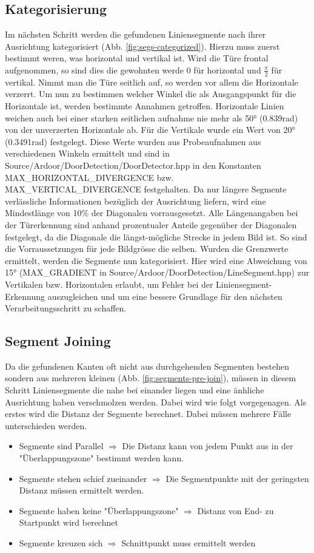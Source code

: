 \subsection{Kategorisierung}
Im nächsten Schritt werden die gefundenen Liniensegmente nach ihrer Ausrichtung kategorisiert (Abb. \ref{fig:segs-categorized}). Hierzu muss zuerst bestimmt weren, was horizontal und vertikal ist. Wird die Türe frontal aufgenommen, so sind dies die gewohnten werde $0$ für horizontal und $\frac{\pi}{2}$ für vertikal. Nimmt man die Türe seitlich auf, so werden vor allem die Horizontale verzerrt. Um nun zu bestimmen welcher Winkel die als Ausgangspunkt für die Horizontale ist, werden bestimmte Annahmen getroffen. Horizontale Linien weichen auch bei einer starken seitlichen aufnahme nie mehr als 50° (0.839rad) von der unverzerten Horizontale ab. Für die Vertikale wurde ein Wert von 20° (0.3491rad) festgelegt. Diese Werte wurden aus Probeaufnahmen aus verschiedenen Winkeln ermittelt und sind in Source/Ardoor/DoorDetection/DoorDetector.hpp in den Konstanten MAX\_HORIZONTAL\_DIVERGENCE bzw. MAX\_VERTICAL\_DIVERGENCE festgehalten. Da nur längere Segmente verlässliche Informationen bezüglich der Ausrichtung liefern, wird eine Mindestlänge von 10\% der Diagonalen vorrausgesetzt. Alle Längenangaben bei der Türerkennung sind anhand prozentualer Anteile gegenüber der Diagonalen festgelegt, da die Diagonale die längst-mögliche Strecke in jedem Bild ist. So sind die Vorraussetzungen für jede Bildgrösse die selben. Wurden die Grenzwerte ermittelt, werden die Segmente nun kategorisiert. Hier wird eine Abweichung von 15° (MAX\_GRADIENT in Source/Ardoor/DoorDetection/LineSegment.hpp) zur Vertikalen bzw. Horizontalen erlaubt, um Fehler bei der Liniensegment-Erkennung auszugleichen und um eine bessere Grundlage für den nächsten Verarbeitungsschritt zu schaffen.

\subsection{Segment Joining}
Da die gefundenen Kanten oft nicht aus durchgehenden Segmenten bestehen sondern aus mehreren kleinen (Abb. \ref{fig:segments-pre-join}), müssen in diesem Schritt Liniensegmente die nahe bei einander liegen und eine änhliche Ausrichtung haben verschmolzen werden. Dabei wird wie folgt vorgegenagen. Als erstes wird die Distanz der Segmente berechnet. Dabei müssen mehrere Fälle unterschieden werden.

\begin{itemize}
	\item Segmente sind Parallel $\Rightarrow$ Die Distanz kann von jedem Punkt aus in der "Überlappungszone" bestimmt werden kann.
	\item Segmente stehen schief zueinander $\Rightarrow$ Die Segmentpunkte mit der geringsten Distanz müssen ermittelt werden.
	\item Segmente haben keine "Überlappungszone" $\Rightarrow$ Distanz von End- zu Startpunkt wird berechnet
	\item Segmente kreuzen sich $\Rightarrow$ Schnittpunkt muss ermittelt werden
\end{itemize}

